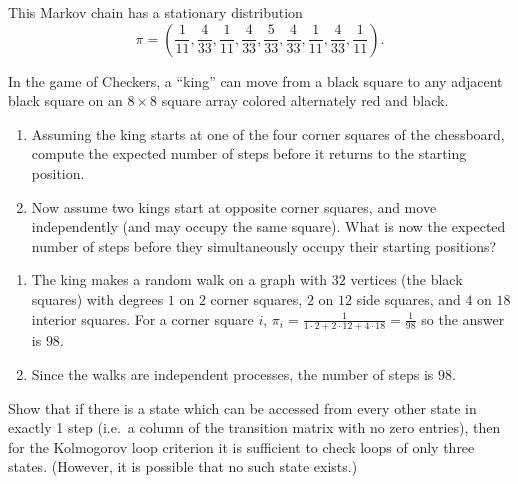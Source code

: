 \documentclass[12pt]{article}
\begin{document}
\begin{solution}
    This Markov chain has a stationary distribution
  \[ \pi = (\frac{1}{11}, \frac{4}{33}, \frac{1}{11}, \frac{4}{33},
    \frac{5}{33}, \frac{4}{33}, \frac{1}{11}, \frac{4}{33}, \frac{1}{11}).
  \]
\end{solution}

\begin{exercise}
  In the game of Checkers, a ``king'' can move from a black
  square to any adjacent black square on an $8 \times 8$ square array
  colored alternately red and black.
    \begin{enumerate}[label=(\alpha*)]
  \item Assuming
 the king starts at one of the four corner squares of the chessboard, compute the expected
number of steps before it returns to the starting position. 
\item  Now assume two kings 
start at opposite corner squares, and move independently (and may
occupy the same square). What is now the expected number of
steps before they simultaneously occupy their starting positions? 
  \end{enumerate}
\end{exercise}
\begin{solution}
  \begin{enumerate}[label=(\alpha*)]
  \item The king makes a random walk on a graph with $32$ vertices (the
    black squares) with degrees $1$ on $2$ corner squares, $2$ on
 $12$ side squares, and $4$ on $18$ interior squares. For a corner
 square $i$, $\pi_i = \frac{1}{1 \cdot 2+ 2 \cdot 12 + 4 \cdot 18} = \frac{1}{98}$
so the answer is $98$.
\item Since the walks are independent processes, the number of steps
  is $98$.
  \end{enumerate}
\end{solution}

\begin{exercise}
Show that if there is a state which can be accessed from every other state in exactly 1 step
(i.e.\ a column of the transition matrix with no zero entries), then
for the Kolmogorov loop criterion it is sufficient to
check loops of only three states. (However, it is possible that no
such state exists.)
\end{exercise}
\begin{solution}
  
\end{solution}
\hr
\end{document}
